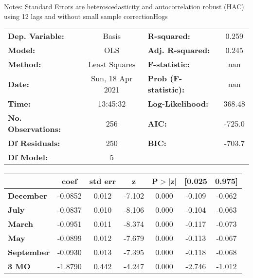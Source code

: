Notes: \newline
 [1] Standard Errors are heteroscedasticity and autocorrelation robust (HAC) using 12 lags and without small sample correctionHogs\begin{center}
\begin{tabular}{lclc}
\toprule
\textbf{Dep. Variable:}    &      Basis       & \textbf{  R-squared:         } &     0.259   \\
\textbf{Model:}            &       OLS        & \textbf{  Adj. R-squared:    } &     0.245   \\
\textbf{Method:}           &  Least Squares   & \textbf{  F-statistic:       } &       nan   \\
\textbf{Date:}             & Sun, 18 Apr 2021 & \textbf{  Prob (F-statistic):} &      nan    \\
\textbf{Time:}             &     13:45:32     & \textbf{  Log-Likelihood:    } &    368.48   \\
\textbf{No. Observations:} &         256      & \textbf{  AIC:               } &    -725.0   \\
\textbf{Df Residuals:}     &         250      & \textbf{  BIC:               } &    -703.7   \\
\textbf{Df Model:}         &           5      & \textbf{                     } &             \\
\bottomrule
\end{tabular}
\begin{tabular}{lcccccc}
                   & \textbf{coef} & \textbf{std err} & \textbf{z} & \textbf{P$> |$z$|$} & \textbf{[0.025} & \textbf{0.975]}  \\
\midrule
\textbf{December}  &      -0.0852  &        0.012     &    -7.102  &         0.000        &       -0.109    &       -0.062     \\
\textbf{July}      &      -0.0837  &        0.010     &    -8.106  &         0.000        &       -0.104    &       -0.063     \\
\textbf{March}     &      -0.0951  &        0.011     &    -8.374  &         0.000        &       -0.117    &       -0.073     \\
\textbf{May}       &      -0.0899  &        0.012     &    -7.679  &         0.000        &       -0.113    &       -0.067     \\
\textbf{September} &      -0.0930  &        0.013     &    -7.395  &         0.000        &       -0.118    &       -0.068     \\
\textbf{3 MO}      &      -1.8790  &        0.442     &    -4.247  &         0.000        &       -2.746    &       -1.012     \\

\end{tabular}
\end{center}
